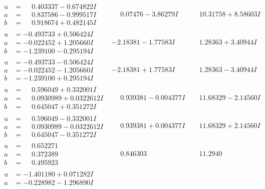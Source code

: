\documentclass[1p]{elsarticle_modified}
\theoremstyle{definition}
\begin{document}
$$\begin{array}{c|c|c}
\begin{aligned}
u &= \phantom{-}0.403337 - 0.674822 I \\
a &= \phantom{-}0.837586 - 0.999517 I \\
b &= \phantom{-}0.918674 + 0.482145 I\end{aligned}
 & \phantom{-}0.07476 - 3.86279 I & \phantom{-}10.31758 + 8.58603 I \\ \hline\begin{aligned}
u &= -0.493733 + 0.506424 I \\
a &= -0.022452 + 1.205660 I \\
b &= -1.239100 - 0.295194 I\end{aligned}
 & -2.18381 - 1.77583 I & \phantom{-}1.28363 + 3.40944 I \\ \hline\begin{aligned}
u &= -0.493733 - 0.506424 I \\
a &= -0.022452 - 1.205660 I \\
b &= -1.239100 + 0.295194 I\end{aligned}
 & -2.18381 + 1.77583 I & \phantom{-}1.28363 - 3.40944 I \\ \hline\begin{aligned}
u &= \phantom{-}0.596049 + 0.332001 I \\
a &= \phantom{-}0.0930989 + 0.0322612 I \\
b &= \phantom{-}0.645047 + 0.351272 I\end{aligned}
 & \phantom{-}0.939381 - 0.004377 I & \phantom{-}11.68329 - 2.14560 I \\ \hline\begin{aligned}
u &= \phantom{-}0.596049 - 0.332001 I \\
a &= \phantom{-}0.0930989 - 0.0322612 I \\
b &= \phantom{-}0.645047 - 0.351272 I\end{aligned}
 & \phantom{-}0.939381 + 0.004377 I & \phantom{-}11.68329 + 2.14560 I \\ \hline\begin{aligned}
u &= \phantom{-}0.652271\phantom{ +0.000000I} \\
a &= \phantom{-}0.372389\phantom{ +0.000000I} \\
b &= \phantom{-}0.495923\phantom{ +0.000000I}\end{aligned}
 & \phantom{-}0.846303\phantom{ +0.000000I} & \phantom{-}11.2940\phantom{ +0.000000I} \\ \hline\begin{aligned}
u &= -1.401180 + 0.071282 I \\
a &= -0.228982 - 1.296890 I \\

\end{aligned}
\end{array}$$
\end{document}
